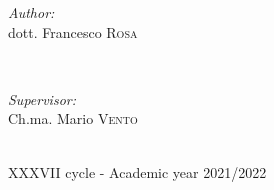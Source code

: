 \begin{titlepage}
\begin{minipage}{0.4\textwidth}
\begin{flushleft} \large
\emph{Author:} \\
dott. Francesco \textsc{Rosa} \newline
\end{flushleft}
\end{minipage}
~
\begin{minipage}{0.37\textwidth}
\begin{flushright} \large
\emph{Supervisor:} \\
Ch.ma. Mario \textsc{Vento}\newline
\end{flushright}
\end{minipage}\\[1.5cm]



{\large XXXVII cycle - Academic year 2021/2022}\\[1cm] %

 

\vfill %
\end{titlepage}